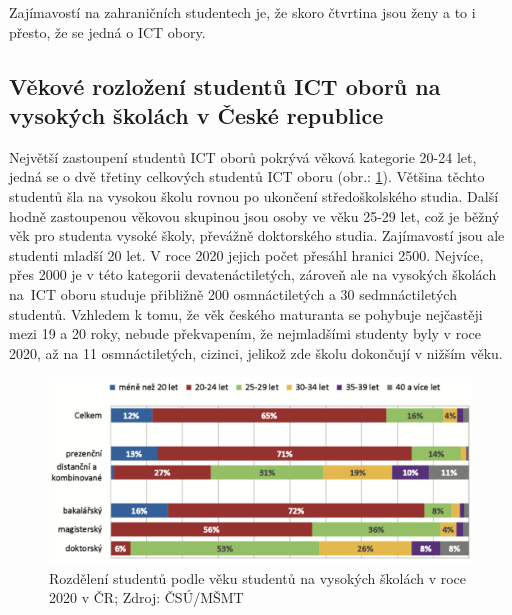 \documentclass[12pt]{report}			%
\begin{document}
                Zajímavostí na zahraničních studentech je, že skoro čtvrtina jsou ženy a to i přesto, že se jedná o ICT obory.~\cite{LidskeZdrojeVIT}
               
                 
               
                
            \subsection{Věkové rozložení studentů ICT oborů na vysokých školách v České republice}
        
                Největší zastoupení studentů ICT oborů pokrývá věková kategorie 20-24 let, jedná se o dvě třetiny celkových studentů ICT oboru (obr.: \ref{fig:vek_VS}). Většina těchto studentů šla na vysokou školu rovnou po ukončení středoškolského studia. Další hodně zastoupenou věkovou skupinou jsou osoby ve věku 25-29 let, což je běžný věk pro studenta vysoké školy, převážně doktorského studia. Zajímavostí jsou ale studenti mladší 20 let. V roce 2020 jejich počet přesáhl hranici 2500. Nejvíce, přes 2000 je v této kategorii devatenáctiletých, zároveň ale na vysokých školách na~ICT oboru studuje přibližně 200 osmnáctiletých a 30 sedmnáctiletých studentů. Vzhledem k tomu, že věk českého maturanta se pohybuje nejčastěji mezi 19 a 20 roky, nebude překvapením, že nejmladšími studenty byly v roce 2020, až na 11 osmnáctiletých, cizinci, jelikož zde školu dokončují v nižším věku.~\cite{LidskeZdrojeVIT}
                 
                 \begin{figure}
                    \centering
                     \includegraphics[width=16cm]{Maturitni Prace/images/vek_VS.png} 
                     \caption[Rozdělení studentů podle věku na VŠ v roce 2020 v ČR]{Rozdělení studentů podle věku studentů na vysokých školách v roce 2020 v ČR; Zdroj: ČSÚ/MŠMT}
                     \label{fig:vek_VS}
                 \end{figure}
                
\end{document}
